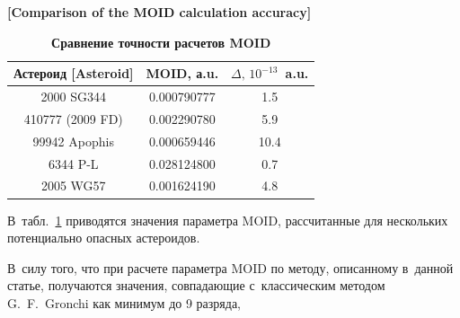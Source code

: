 \begin{table}[!t]

\center

\begin{minipage}{.58\textwidth}

	\center \small

	\caption{\bf Сравнение точности расчетов MOID}

\vspace{-3mm}

	\textbf{ [Comparison of the MOID calculation accuracy]}

	\label{tb:asteroidMOID}

\begin{tabular}[h]{c|c|c}

			\hline

\scriptsize Астероид [Asteroid] & 

\scriptsize MOID, а.u. &

\scriptsize  $\Delta,\, 10^{-13}$~a.u.\\

			\hline

\rule{0mm}{12pt}

			2000 SG344 & 0.000790777 & 1.5 \\[1pt]

			410777 (2009 FD) & 0.002290780 & 5.9 \\[1pt]

			99942 Apophis & 0.000659446 & 10.4 \\[1pt]

			6344 P-L & 0.028124800 & 0.7 \\[1pt]

			2005 WG57 & 0.001624190 & 4.8 \\[1pt]

\hline

			\end{tabular}

\end{minipage}

\vspace{-3mm}

\end{table}





В~табл.~\ref{tb:asteroidMOID} приводятся значения параметра MOID, рассчитанные для \linebreak нескольких потенциально опасных астероидов. 

В~силу того, что при расчете параметра MOID по методу, описанному в~данной статье, получаются значения, совпадающие с~классическим методом G.~F.~Gronchi как минимум до 9 разряда, 

